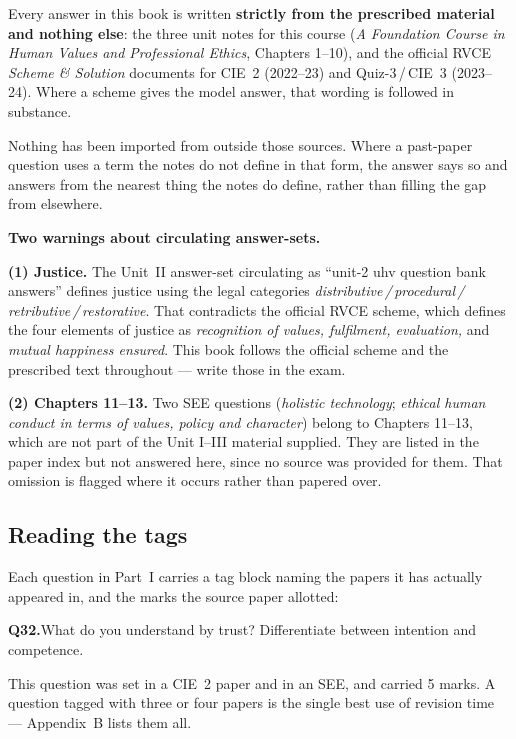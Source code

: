 Every answer in this book is written \textbf{strictly from the prescribed
material and nothing else}: the three unit notes for this course (\emph{A
Foundation Course in Human Values and Professional Ethics}, Chapters 1--10),
and the official RVCE \emph{Scheme \& Solution} documents for CIE~2 (2022--23)
and Quiz-3\,/\,CIE~3 (2023--24). Where a scheme gives the model answer, that
wording is followed in substance.

Nothing has been imported from outside those sources. Where a past-paper
question uses a term the notes do not define in that form, the answer says so
and answers from the nearest thing the notes do define, rather than filling
the gap from elsewhere.

\begin{note}
\textbf{\sffamily Two warnings about circulating answer-sets.}

\textbf{(1) Justice.} The Unit~II answer-set circulating as ``unit-2 uhv
question bank answers'' defines justice using the legal categories
\emph{distributive\,/\,procedural\,/\,retributive\,/\,restorative}. That
contradicts the official RVCE scheme, which defines the four elements of
justice as \emph{recognition of values, fulfilment, evaluation,} and
\emph{mutual happiness ensured}. This book follows the official scheme and the
prescribed text throughout --- write those in the exam.

\textbf{(2) Chapters 11--13.} Two SEE questions (\emph{holistic technology};
\emph{ethical human conduct in terms of values, policy and character}) belong
to Chapters 11--13, which are not part of the Unit I--III material supplied.
They are listed in the paper index but not answered here, since no source was
provided for them. That omission is flagged where it occurs rather than
papered over.
\end{note}

\subsection*{Reading the tags}

Each question in Part~I carries a tag block naming the papers it has actually
appeared in, and the marks the source paper allotted:

\vspace{4pt}
\begin{keybox}
\textbf{Q32.}\enspace What do you understand by trust? Differentiate between
intention and competence.

\vspace{5pt}
{\footnotesize This question was set in a CIE~2 paper and in an SEE, and
carried 5 marks. A question tagged with three or four papers is the single
best use of revision time --- Appendix~B lists them all.}
\end{keybox}

